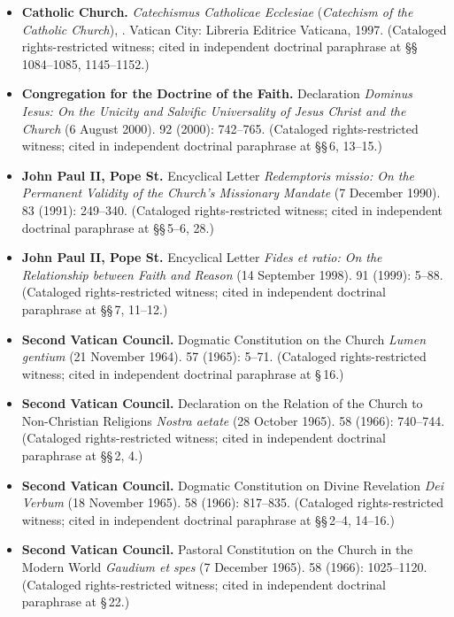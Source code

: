\begin{itemize}
\item \textbf{Catholic Church.} \textit{Catechismus Catholicae Ecclesiae} (\textit{Catechism of the Catholic Church}), . Vatican City: Libreria Editrice Vaticana, 1997. (Cataloged rights-restricted witness; cited in independent doctrinal paraphrase at \S\S\,1084--1085, 1145--1152.)
\item \textbf{Congregation for the Doctrine of the Faith.} Declaration \textit{Dominus Iesus: On the Unicity and Salvific Universality of Jesus Christ and the Church} (6 August 2000).  92 (2000): 742--765. (Cataloged rights-restricted witness; cited in independent doctrinal paraphrase at \S\S\,6, 13--15.)
\item \textbf{John Paul II, Pope St.} Encyclical Letter \textit{Redemptoris missio: On the Permanent Validity of the Church's Missionary Mandate} (7 December 1990).  83 (1991): 249--340. (Cataloged rights-restricted witness; cited in independent doctrinal paraphrase at \S\S\,5--6, 28.)
\item \textbf{John Paul II, Pope St.} Encyclical Letter \textit{Fides et ratio: On the Relationship between Faith and Reason} (14 September 1998).  91 (1999): 5--88. (Cataloged rights-restricted witness; cited in independent doctrinal paraphrase at \S\S\,7, 11--12.)
\item \textbf{Second Vatican Council.} Dogmatic Constitution on the Church \textit{Lumen gentium} (21 November 1964).  57 (1965): 5--71. (Cataloged rights-restricted witness; cited in independent doctrinal paraphrase at \S\,16.)
\item \textbf{Second Vatican Council.} Declaration on the Relation of the Church to Non-Christian Religions \textit{Nostra aetate} (28 October 1965).  58 (1966): 740--744. (Cataloged rights-restricted witness; cited in independent doctrinal paraphrase at \S\S\,2, 4.)
\item \textbf{Second Vatican Council.} Dogmatic Constitution on Divine Revelation \textit{Dei Verbum} (18 November 1965).  58 (1966): 817--835. (Cataloged rights-restricted witness; cited in independent doctrinal paraphrase at \S\S\,2--4, 14--16.)
\item \textbf{Second Vatican Council.} Pastoral Constitution on the Church in the Modern World \textit{Gaudium et spes} (7 December 1965).  58 (1966): 1025--1120. (Cataloged rights-restricted witness; cited in independent doctrinal paraphrase at \S\,22.)
\end{itemize}


